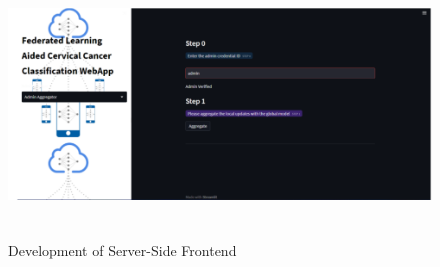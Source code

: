 \begin{itemize}
    \begin{figure}[H]
    \centering
    \includegraphics[width=160mm,height=70mm]{figures/frontend3.png}
    \caption{Development of Server-Side Frontend}
    \label{DLAccuracy}
    \end{figure}
\end{itemize}







